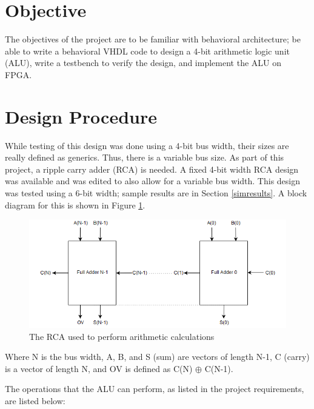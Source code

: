 \documentclass[12pt]{article}
\begin{document}
\newpage

\section{Objective} \label{sec:obj}
The objectives of the project are to be familiar with behavioral architecture; be able
to write a behavioral VHDL code to design a 4-bit arithmetic logic unit (ALU), write
a testbench to verify the design, and implement the ALU on FPGA.

\section{Design Procedure} \label{sec:desproc}
While testing of this design was done using a 4-bit bus width, their sizes are really defined as generics.  Thus, there is a variable bus size.  As part of this project, a ripple carry adder (RCA) is needed.  A fixed 4-bit width RCA design was available and was edited to also allow for a variable bus width.  This design was tested using a 6-bit width; sample results are in Section \ref{simresults}.	A block diagram for this is shown in Figure \ref{fig:rca}.

\begin{figure}[H]
\begin{center}
\includegraphics[scale=0.6]{Scalable_rca.png}
\caption{The RCA used to perform arithmetic calculations}
\label{fig:rca}
\end{center}
\end{figure}

Where N is the bus width, A, B, and S (sum) are vectors of length N-1, C (carry) is a vector of length N, and OV is defined as C(N) $\oplus$ C(N-1).

\newpage

The operations that the ALU can perform, as listed in the project requirements, are listed below:
\end{document}
